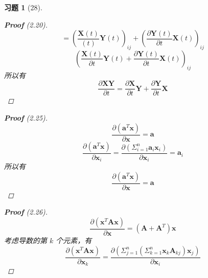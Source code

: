 \documentclass[a4paper, UTF8]{ctexart}
\newtheorem*{exercise}{\textbf{习题}}
\begin{document}
\begin{exercise}[28]
\begin{proof}[\textbf{Proof} (2.20)]
\begin{equation*}
		\end{equation*}
		\begin{equation*}
			= \left( \frac{\mathbf{X}\left( t \right)}{\left( t \right)}\mathbf{Y} \left( t \right)\right)_{ij} + \left( \frac{\partial \mathbf{Y}\left( t \right)}{\partial t }\mathbf{X}\left( t \right)\right)_{ij}
		\end{equation*}
		\begin{equation*}
			\left( \frac{\mathbf{X}\left( t \right)}{\partial t}\mathbf{Y}\left( t \right) + \frac{\partial \mathbf{Y}\left( t \right)}{\partial t}\mathbf{X}\left( t \right)\right)_{ij}
		\end{equation*}
		所以有
		\begin{equation*}
			\frac{\partial\mathbf{XY}}{\partial t} = \frac{\partial \mathbf{X}}{\partial t} \mathbf{Y} + \frac{\partial \mathbf{Y}}{\partial t} \mathbf{X}
		\end{equation*}
	\end{proof}
	\begin{proof}[\textbf{Proof} (2.25)]
		\begin{equation*}
			\frac{\partial \left(\mathbf{a}^T\mathbf{x}\right)}{\partial \mathbf{x}} = \mathbf{a}
		\end{equation*}
		\begin{equation*}
			\frac{\partial \left( \mathbf{a}^T \mathbf{x} \right)}{\partial \mathbf{x}_i}= \frac{\partial \left( \Sigma_{i=1}^n \mathbf{a}_i \mathbf{x}_i \right)}{\partial \mathbf{x}_i} = \mathbf{a}_i
		\end{equation*}
		所以有
		\begin{equation*}
			\frac{\partial \left( \mathbf{a}^T \mathbf{x} \right)}{\partial \mathbf{x}} = \mathbf{a}
		\end{equation*}
	\end{proof}
	\begin{proof}[\textbf{Proof} (2.26)]
		\begin{equation*}
			\frac{\partial \left(\mathbf{x}^T \mathbf{A} \mathbf{x}\right)}{\partial \mathbf{x}} = \left( \mathbf{A} + \mathbf{A}^T \right) \mathbf{x}
		\end{equation*}
		考虑导数的第 $k$ 个元素，有
		\begin{equation*}
			\frac{\partial \left( \mathbf{x}^T \mathbf{A}\mathbf{x} \right)}{\partial \mathbf{x}_k} = \frac{\partial \left( \Sigma_{j=1}^n \left( \Sigma_{k=1}^n \mathbf{x}_k \mathbf{A}_{kj} \right) \mathbf{x}_j \right)}{\partial \mathbf{x}_i}
		\end{equation*}
		\begin{equation*}

\end{equation*}
\end{proof}
\end{exercise}
\end{document}
